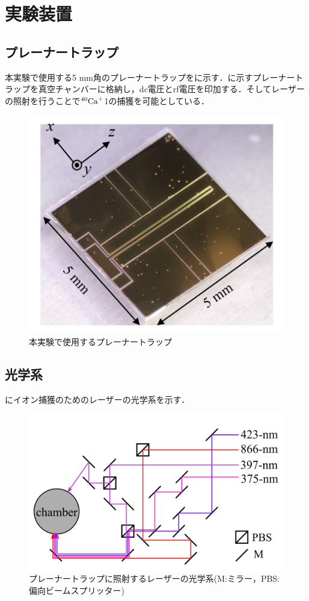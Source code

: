 \chapter{実験装置}\label{experimental_setup}
\section{プレーナートラップ}
本実験で使用する5 mm角のプレーナートラップをに示す．に示すプレーナートラップを真空チャンバーに格納し，dc電圧とrf電圧を印加する．そしてレーザーの照射を行うことで$^{40}{\rm Ca}^+$1の捕獲を可能としている．
\begin{figure}[h]
	\begin{center}
		\includegraphics[width = 0.4\linewidth]{./experimental_setup/figure/Using_PlannerTrap.png}
		\caption{本実験で使用するプレーナートラップ}
		\label{fig:PlanarTrap}
	\end{center}
\end{figure}

\section{光学系}
にイオン捕獲のためのレーザーの光学系を示す．
\begin{figure}[h]
	\centering
		\includegraphics[width = 0.5\linewidth]{./experimental_setup/figure/Optical_System.png}
		\caption{プレーナートラップに照射するレーザーの光学系(M:ミラー，PBS:偏向ビームスプリッター)}
		\label{fig:optical_system}
\end{figure}

